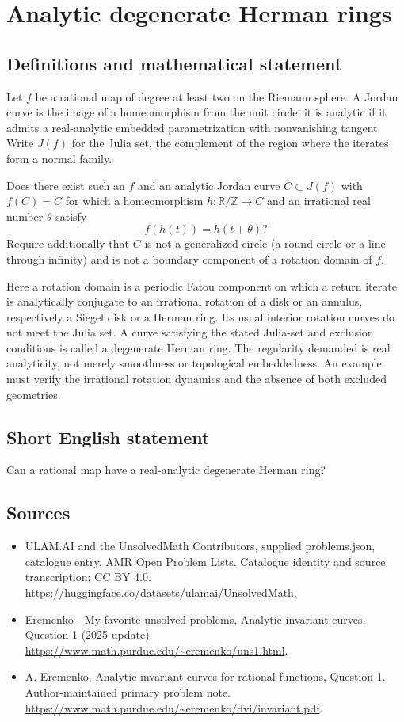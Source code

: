 \documentclass[11pt,a4paper]{article}
\begin{document}
\section*{Analytic degenerate Herman rings}\label{statement}

\subsection{Definitions and mathematical statement}
Let $f$ be a rational map of degree at least two on the
Riemann sphere. A Jordan curve is the image of a homeomorphism
from the unit circle; it is analytic if it admits a real-analytic
embedded parametrization with nonvanishing tangent.
Write $J(f)$ for the Julia set, the complement of the region
where the iterates form a normal family.

Does there exist such an $f$ and an analytic Jordan curve
$C\subset J(f)$ with $f(C)=C$ for which a homeomorphism
$h:\mathbb R/\mathbb Z\to C$ and an irrational real number
$\theta$ satisfy
\[
                   f(h(t))=h(t+\theta)?
\]
Require additionally that $C$ is not a generalized circle
(a round circle or a line through infinity) and is not a
boundary component of a rotation domain of $f$.

Here a rotation domain is a periodic Fatou component on
which a return iterate is analytically conjugate to an
irrational rotation of a disk or an annulus, respectively a
Siegel disk or a Herman ring. Its usual interior rotation
curves do not meet the Julia set. A curve satisfying the
stated Julia-set and exclusion conditions is called a
degenerate Herman ring.
The regularity demanded is real analyticity, not merely
smoothness or topological embeddedness. An example must
verify the irrational rotation dynamics and the absence of
both excluded geometries.
\subsection{Short English statement}
Can a rational map have a real-analytic degenerate Herman ring?
\subsection{Sources}
\begin{itemize}
\item[S1] ULAM.AI and the UnsolvedMath Contributors, supplied problems.json, catalogue entry, AMR Open Problem Lists. Catalogue identity and source transcription; CC BY 4.0.
\url{https://huggingface.co/datasets/ulamai/UnsolvedMath}.
\item[S2] Eremenko - My favorite unsolved problems, Analytic invariant curves, Question 1 (2025 update). 
\url{https://www.math.purdue.edu/~eremenko/uns1.html}.
\item[S3] A. Eremenko, Analytic invariant curves for rational functions, Question 1. Author-maintained primary problem note.
\url{https://www.math.purdue.edu/~eremenko/dvi/invariant.pdf}.
\end{itemize}
\end{document}
